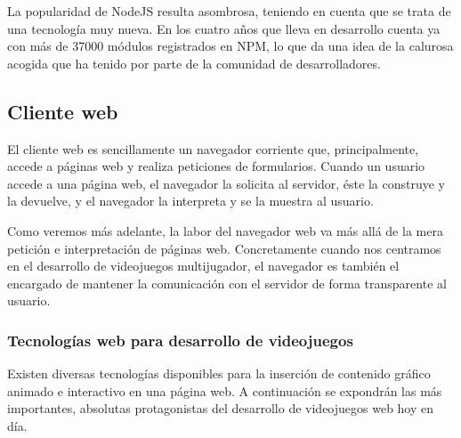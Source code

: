 La popularidad de NodeJS resulta asombrosa, teniendo en cuenta que se trata de una tecnología muy nueva. En los cuatro años que lleva en desarrollo cuenta ya con más de 37000 módulos registrados en \acs{NPM}, lo que da una idea de la calurosa acogida que ha tenido por parte de la comunidad de desarrolladores.

\subsection{Cliente web}
\label{sec::desarrollo-juegos}

El cliente web es sencillamente un navegador corriente que, principalmente, accede a páginas web y realiza peticiones de formularios. Cuando un usuario accede a una página web, el navegador la solicita al servidor, éste la construye y la devuelve, y el navegador la interpreta y se la muestra al usuario.

Como veremos más adelante, la labor del navegador web va más allá de la mera petición e interpretación de páginas web. Concretamente cuando nos centramos en el desarrollo de videojuegos multijugador, el navegador es también el encargado de mantener la comunicación con el servidor de forma transparente al usuario.

\subsubsection{Tecnologías web para desarrollo de videojuegos}

Existen diversas tecnologías disponibles para la inserción de contenido gráfico animado e interactivo en una página web. A continuación se expondrán las más importantes, absolutas protagonistas del desarrollo de videojuegos web hoy en día.

